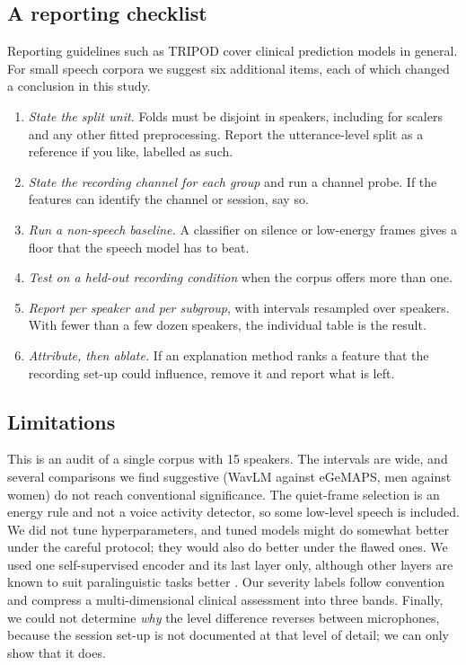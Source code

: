 \documentclass[conference]{IEEEtran}
\begin{document}
\subsection{A reporting checklist}
Reporting guidelines such as TRIPOD \cite{collins2015} cover clinical prediction models in general. For small speech corpora we suggest six additional items, each of which changed a conclusion in this study.
\begin{enumerate}
\item \emph{State the split unit.} Folds must be disjoint in speakers, including for scalers and any other fitted preprocessing. Report the utterance-level split as a reference if you like, labelled as such.
\item \emph{State the recording channel for each group} and run a channel probe. If the features can identify the channel or session, say so.
\item \emph{Run a non-speech baseline.} A classifier on silence or low-energy frames gives a floor that the speech model has to beat.
\item \emph{Test on a held-out recording condition} when the corpus offers more than one.
\item \emph{Report per speaker and per subgroup}, with intervals resampled over speakers. With fewer than a few dozen speakers, the individual table is the result.
\item \emph{Attribute, then ablate.} If an explanation method ranks a feature that the recording set-up could influence, remove it and report what is left.
\end{enumerate}

\subsection{Limitations}
This is an audit of a single corpus with 15 speakers. The intervals are wide, and several comparisons we find suggestive (WavLM against eGeMAPS, men against women) do not reach conventional significance. The quiet-frame selection is an energy rule and not a voice activity detector, so some low-level speech is included. We did not tune hyperparameters, and tuned models might do somewhat better under the careful protocol; they would also do better under the flawed ones. We used one self-supervised encoder and its last layer only, although other layers are known to suit paralinguistic tasks better \cite{javanmardi2023}. Our severity labels follow convention and compress a multi-dimensional clinical assessment into three bands. Finally, we could not determine \emph{why} the level difference reverses between microphones, because the session set-up is not documented at that level of detail; we can only show that it does.
\end{document}
